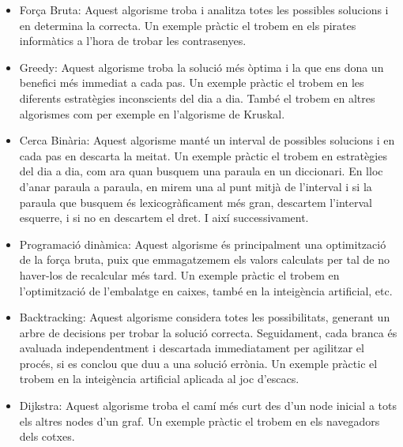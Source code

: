 \begin{itemize}
    \item Força Bruta: Aquest algorisme troba i analitza totes les possibles solucions i en determina la correcta. Un exemple pràctic el trobem en els pirates informàtics a l'hora de trobar les contrasenyes. \newline

    \item Greedy: Aquest algorisme troba la solució més òptima i la que ens dona un benefici més immediat a cada pas.
    Un exemple pràctic el trobem en les diferents estratègies inconscients del dia a dia. També el trobem en altres algorismes com per exemple en l'algorisme de Kruskal. \newline

    \item Cerca Binària: Aquest algorisme manté un interval de possibles solucions i en cada pas en descarta la meitat. Un exemple pràctic el trobem en estratègies del dia a dia, com ara quan busquem una paraula en un diccionari. En lloc d'anar paraula a paraula, en mirem una al punt mitjà de l'interval i si la paraula que busquem és lexicogràficament més gran, descartem l'interval esquerre, i si no en descartem el dret. I així successivament. \newline

    \item Programació dinàmica: Aquest algorisme és principalment una optimització de la força bruta, puix que emmagatzemem els valors calculats per tal de no haver-los de recalcular més tard. Un exemple pràctic el trobem en l'optimització de l'embalatge en caixes, també en la inte\lgem igència artificial, etc. \newline

    
    \item Backtracking: Aquest algorisme considera totes les possibilitats, generant un arbre de decisions per trobar la solució correcta. Seguidament, cada branca és avaluada independentment i descartada immediatament per agilitzar el procés, si es conclou que duu a una solució errònia. Un exemple pràctic el trobem en la inte\lgem igència artificial aplicada al joc d'escacs. \newline%
 
    \item Dijkstra: Aquest algorisme troba el camí més curt des d'un node inicial a tots els altres nodes d'un graf. Un exemple pràctic el trobem en els navegadors dels cotxes. 
\end{itemize}

